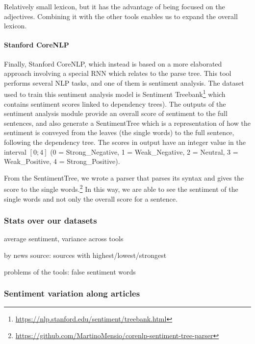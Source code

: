 Relatively small lexicon, but it has the advantage of being focused on the adjectives. Combining it with the other tools enables us to expand the overall lexicon.


\paragraph{Stanford CoreNLP}
Finally, Stanford CoreNLP, which instead is based on a more elaborated approach involving a special RNN which relates to the parse tree. This tool performs several NLP tasks, and one of them is sentiment analysis.
The dataset used to train this sentiment analysis model is Sentiment Treebank\footnote{\url{https://nlp.stanford.edu/sentiment/treebank.html}} which contains sentiment scores linked to dependency trees).
The outputs of the sentiment analysis module provide an overall score of sentiment to the full sentences, and also generate a SentimentTree which is a representation of how the sentiment is conveyed from the leaves (the single words) to the full sentence, following the dependency tree.
The scores in output have an integer value in the interval $[0;4]$ (0 = Strong\_Negative, 1 = Weak\_Negative, 2 = Neutral, 3 = Weak\_Positive, 4 = Strong\_Positive).

From the SentimentTree, we wrote a parser that parses its syntax and gives the score to the single words.\footnote{\url{https://github.com/MartinoMensio/corenlp-sentiment-tree-parser}}
In this way, we are able to see the sentiment of the single words and not only the overall score for a sentence.


\subsubsection{\statusred Stats over our datasets}



average sentiment, variance across tools

by news source: sources with highest/lowest/strongest

problems of the tools: false sentiment words


\subsubsection{\statusorange Sentiment variation along articles}

